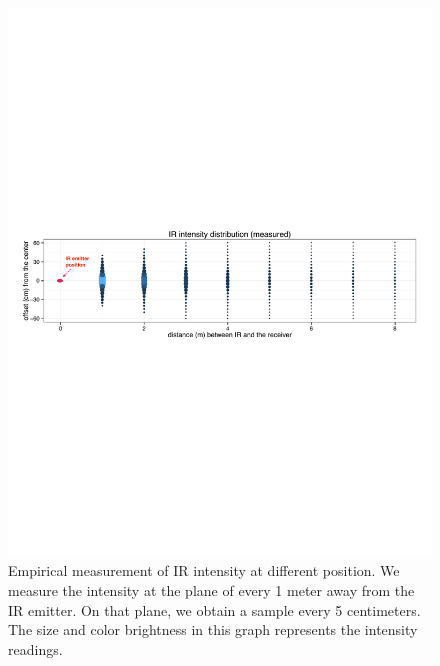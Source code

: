 \begin{figure}[t]
\centering
\includegraphics[width=1\columnwidth]{figures/IRIntensityDistribution.pdf}
\caption{Empirical measurement of IR intensity at different position. We measure the intensity at the plane of every 1 meter away from the IR emitter. On that plane, we obtain a sample every 5 centimeters. The size and color brightness in this graph represents the intensity readings.}
\label{fig:measurement}
\end{figure}

